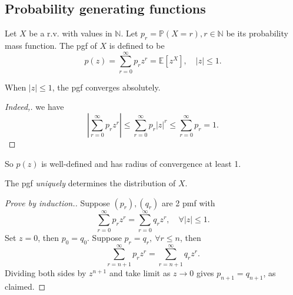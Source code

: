 \subsection{Probability generating functions}
\begin{definition}
    Let $X$ be a r.v. with values in $ \mathbb{N} $. Let $ p_r = \mathbb{P}(X=r), r\in \mathbb{N} $ be its probability mass function. The pgf of $X$ is defined to be 
    \[
        p(z) = \sum_{r=0}^{\infty} p_r z^r = \mathbb{E}[z^X],\quad |z|\le 1.
    \]
\end{definition}

\begin{claim}
    When $ |z|\le 1 $, the pgf converges absolutely.
\end{claim}
\begin{proof}[Indeed,]
    we have 
    \[
        \left| \sum_{r=0}^{\infty} p_r z^r \right| \le \sum_{r=0}^{\infty} p_r |z|^r\le \sum_{r=0}^{\infty}p_r=1.
    \]
\end{proof}
So $ p(z) $ is well-defined and has radius of convergence at least 1.

\begin{theorem}
    The pgf \textit{uniquely} determines the distribution of $X$.
\end{theorem}
\begin{proof}[Prove by induction.]
    Suppose $(p_r),(q_r)$ are 2 pmf with 
    \[
        \sum_{r=0}^{\infty} p_r z^r = \sum_{r=0}^{\infty}q_rz^r,\quad \forall |z|\le 1.
    \]
    Set $z=0$, then $ p_0=q_0 $. Suppose $ p_r=q_r,\ \forall r\le n $, then 
    \[
        \sum_{r=n+1}^{\infty}p_rz^r = \sum_{r=n+1}^{\infty} q_rz^r.
    \]
    Dividing both sides by $ z^{n+1} $ and take limit as $ z\to 0  $ gives $ p_{n+1}=q_{n+1} $, as claimed.
\end{proof}

